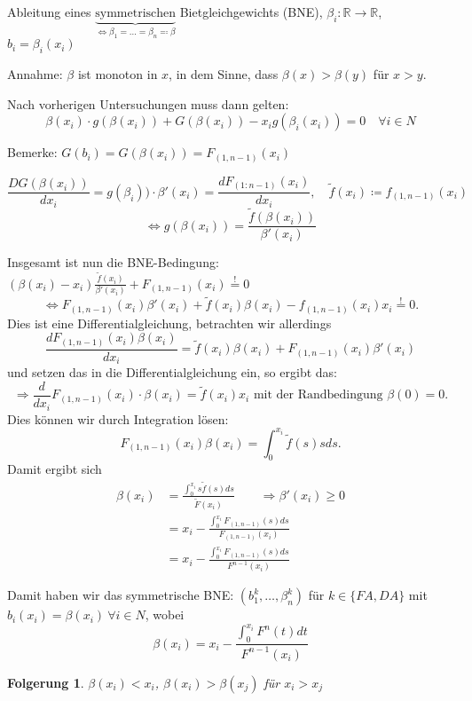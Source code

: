 \documentclass[12pt]{extreport} %
\theoremstyle{named}
\theoremstyle{itshape}
\theoremstyle{normal}
\newtheorem{folgerung}[unnamedtheorem]{Folgerung}
\begin{document}
Ableitung eines $\underbrace{\text{symmetrischen}}_{\iff \beta_{1} = \dotsc = \beta_{n} \eqqcolon \beta}$ Bietgleichgewichts (BNE), $\beta_{i} \colon \mathbb{R} \rightarrow \mathbb{R}$, $b_{i} = \beta_{i}(x_{i})$

Annahme: $\beta$ ist monoton in $x$, in dem Sinne, dass $\beta(x) > \beta(y)$ für $x > y$.

Nach vorherigen Untersuchungen muss dann gelten:
$$ \beta(x_i) \cdot g(\beta(x_{i})) + G(\beta(x_{i})) - x_{i} g(\beta_{i}(x_{i})) = 0 \quad \forall i \in N $$

Bemerke: $G(b_{i}) = G(\beta(x_{i})) = F_{(1,n-1)}(x_{i})$

$$ \frac{D G(\beta(x_{i}))}{d x_{i}} = g(\beta_{i})) \cdot \beta'(x_{i}) = \frac{d F_{(1:n-1)}(x_{i})}{dx_{i}}, \quad \tilde{f}(x_{i}) \coloneqq f_{(1, n-1)}(x_{i}) $$
$$ \iff g(\beta(x_{i})) = \frac{\tilde{f}(\beta(x_{i}))}{\beta'(x_{i})} $$

Insgesamt ist nun die BNE-Bedingung: $(\beta(x_{i}) - x_{i}) \frac{\tilde{f}(x_{i})}{\beta'(x_{i})} + F_{(1,n-1)}(x_{i}) \overset{!}{=} 0$
$$ \iff F_{(1, n-1)}(x_{i}) \beta'(x_{i}) + \tilde{f}(x_{i}) \beta(x_{i}) - f_{(1, n-1)}(x_{i}) x_{i} \overset{!}{=} 0. $$
Dies ist eine Differentialgleichung, betrachten wir allerdings
$$ \frac{d F_{(1,n-1)}(x_{i}) \beta(x_{i})}{d x_{i}} = \tilde{f}(x_{i}) \beta(x_{i}) + F_{(1, n-1)}(x_{i}) \beta'(x_{i}) $$
und setzen das in die Differentialgleichung ein, so ergibt das:
$$ \Rightarrow \frac{d}{dx_{i}} F_{(1,n-1)}(x_{i}) \cdot \beta(x_{i}) = \tilde{f}(x_{i}) x_{i} \text{ mit der Randbedingung } \beta(0) = 0. $$
Dies können wir durch Integration lösen:
$$ F_{(1, n-1)}(x_{i}) \beta(x_{i}) = \int_{0}^{x_{i}} \tilde{f}(s) s ds. $$
Damit ergibt sich
\begin{align*}
	\beta(x_{i}) & = \frac{\int_{0}^{x_{i}} s \tilde{f}(s) ds}{\tilde{F}(x_{i})} \qquad \Rightarrow \beta'(x_{i}) \geq 0 \\
	& = x_{i} - \frac{\int_{0}^{x_{i}} F_{(1, n-1)}(s) ds}{F_{(1,n-1)}(x_{i})} \\
	& = x_{i} - \frac{\int_{0}^{x_{i}} F_{(1,n-1)}(s) ds}{F^{n-1}(x_{i})} 
\end{align*}

Damit haben wir das symmetrische BNE: $(b_{1}^{k}, \dotsc, \beta_{n}^{k})$ für $k \in \{ FA, DA \}$ mit $b_{i}(x_{i}) = \beta(x_{i}) ~\forall i \in N$, wobei
$$ \beta(x_{i}) = x_{i} - \frac{\int_{0}^{x_{i}}F^{n}(t) dt}{F^{n-1}(x_{i})} $$

\begin{folgerung}
	$\beta(x_{i}) < x_{i}$, $\beta(x_{i}) > \beta(x_{j})$ für $x_{i} > x_{j}$
\end{folgerung}
\end{document}
